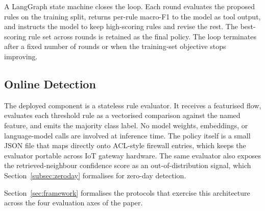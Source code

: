 A LangGraph state machine closes the loop. Each round evaluates the proposed
rules on the training split, returns per-rule macro-F1 to the model as tool
output, and instructs the model to keep high-scoring rules and revise the
rest. The best-scoring rule set across rounds is retained as the final
policy. The loop terminates after a fixed number of rounds or when the
training-set objective stops improving.

\subsection{Online Detection}
\label{subsec:online}

The deployed component is a stateless rule evaluator. It receives a
featurised flow, evaluates each threshold rule as a vectorised comparison
against the named feature, and emits the majority class label. No model
weights, embeddings, or language-model calls are involved at inference time.
The policy itself is a small JSON file that maps directly onto ACL-style
firewall entries, which keeps the evaluator portable across IoT gateway
hardware. The same evaluator also exposes the retrieved-neighbour confidence
score as an out-of-distribution signal, which Section~\ref{subsec:zeroday}
formalises for zero-day detection.

Section~\ref{sec:framework} formalises the protocols that exercise this
architecture across the four evaluation axes of the paper.
